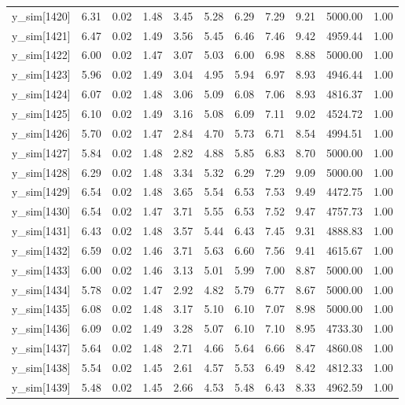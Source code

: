 \begin{table}[ht]
\begin{tabular}{rrrrrrrrrrr}
  y\_sim[1420] & 6.31 & 0.02 & 1.48 & 3.45 & 5.28 & 6.29 & 7.29 & 9.21 & 5000.00 & 1.00 \\ 
  y\_sim[1421] & 6.47 & 0.02 & 1.49 & 3.56 & 5.45 & 6.46 & 7.46 & 9.42 & 4959.44 & 1.00 \\ 
  y\_sim[1422] & 6.00 & 0.02 & 1.47 & 3.07 & 5.03 & 6.00 & 6.98 & 8.88 & 5000.00 & 1.00 \\ 
  y\_sim[1423] & 5.96 & 0.02 & 1.49 & 3.04 & 4.95 & 5.94 & 6.97 & 8.93 & 4946.44 & 1.00 \\ 
  y\_sim[1424] & 6.07 & 0.02 & 1.48 & 3.06 & 5.09 & 6.08 & 7.06 & 8.93 & 4816.37 & 1.00 \\ 
  y\_sim[1425] & 6.10 & 0.02 & 1.49 & 3.16 & 5.08 & 6.09 & 7.11 & 9.02 & 4524.72 & 1.00 \\ 
  y\_sim[1426] & 5.70 & 0.02 & 1.47 & 2.84 & 4.70 & 5.73 & 6.71 & 8.54 & 4994.51 & 1.00 \\ 
  y\_sim[1427] & 5.84 & 0.02 & 1.48 & 2.82 & 4.88 & 5.85 & 6.83 & 8.70 & 5000.00 & 1.00 \\ 
  y\_sim[1428] & 6.29 & 0.02 & 1.48 & 3.34 & 5.32 & 6.29 & 7.29 & 9.09 & 5000.00 & 1.00 \\ 
  y\_sim[1429] & 6.54 & 0.02 & 1.48 & 3.65 & 5.54 & 6.53 & 7.53 & 9.49 & 4472.75 & 1.00 \\ 
  y\_sim[1430] & 6.54 & 0.02 & 1.47 & 3.71 & 5.55 & 6.53 & 7.52 & 9.47 & 4757.73 & 1.00 \\ 
  y\_sim[1431] & 6.43 & 0.02 & 1.48 & 3.57 & 5.44 & 6.43 & 7.45 & 9.31 & 4888.83 & 1.00 \\ 
  y\_sim[1432] & 6.59 & 0.02 & 1.46 & 3.71 & 5.63 & 6.60 & 7.56 & 9.41 & 4615.67 & 1.00 \\ 
  y\_sim[1433] & 6.00 & 0.02 & 1.46 & 3.13 & 5.01 & 5.99 & 7.00 & 8.87 & 5000.00 & 1.00 \\ 
  y\_sim[1434] & 5.78 & 0.02 & 1.47 & 2.92 & 4.82 & 5.79 & 6.77 & 8.67 & 5000.00 & 1.00 \\ 
  y\_sim[1435] & 6.08 & 0.02 & 1.48 & 3.17 & 5.10 & 6.10 & 7.07 & 8.98 & 5000.00 & 1.00 \\ 
  y\_sim[1436] & 6.09 & 0.02 & 1.49 & 3.28 & 5.07 & 6.10 & 7.10 & 8.95 & 4733.30 & 1.00 \\ 
  y\_sim[1437] & 5.64 & 0.02 & 1.48 & 2.71 & 4.66 & 5.64 & 6.66 & 8.47 & 4860.08 & 1.00 \\ 
  y\_sim[1438] & 5.54 & 0.02 & 1.45 & 2.61 & 4.57 & 5.53 & 6.49 & 8.42 & 4812.33 & 1.00 \\ 
  y\_sim[1439] & 5.48 & 0.02 & 1.45 & 2.66 & 4.53 & 5.48 & 6.43 & 8.33 & 4962.59 & 1.00 \\ 

\end{tabular}
\end{table}

